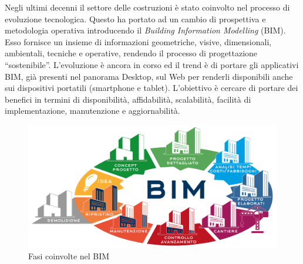 Negli ultimi decenni il settore delle costruzioni è stato coinvolto nel processo di evoluzione tecnologica.
Questo ha portato ad un cambio di prospettiva e metodologia operativa introducendo il \emph{Building Information Modelling} (BIM).
Esso fornisce un insieme di informazioni geometriche, visive, dimensionali, ambientali, tecniche e operative, rendendo
il processo di progettazione ``sostenibile''.
L'evoluzione è ancora in corso ed il trend è di portare gli applicativi BIM, già presenti nel panorama Desktop, sul Web per renderli
disponibili anche sui dispositivi portatili (smartphone e tablet). L'obiettivo è cercare di portare dei benefici in termini di
disponibilità, affidabilità,
scalabilità, facilità di implementazione, manutenzione e aggiornabilità.

\begin{figure}[htbp] %
   \centering
   \includegraphics[width=1\linewidth]{images/bim}
   \caption{Fasi coinvolte nel BIM}
   \label{fig:bim}
\end{figure}
\newpage
